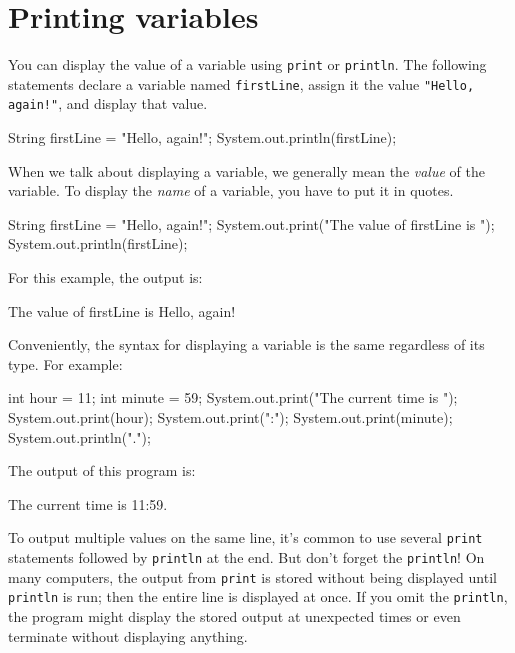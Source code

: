 \documentclass[12pt]{book}
\theoremstyle{exercise}
\newcommand{\java}[1]{\verb"#1"}
\begin{document}
\section{Printing variables}
\label{sec:printvar}

You can display the value of a variable using \java{print} or \java{println}.
The following statements declare a variable named \java{firstLine}, assign it the value \verb|"Hello, again!"|, and display that value.


\begin{code}
    String firstLine = "Hello, again!";
    System.out.println(firstLine);
\end{code}

%

When we talk about displaying a variable, we generally mean the {\em value} of the variable.
To display the {\em name} of a variable, you have to put it in quotes.

\begin{code}
    String firstLine = "Hello, again!";
    System.out.print("The value of firstLine is ");
    System.out.println(firstLine);
\end{code}

For this example, the output is:

\begin{stdout}
The value of firstLine is Hello, again!
\end{stdout}

Conveniently, the syntax for displaying a variable is the same regardless of its type.
For example:

\begin{code}
    int hour = 11;
    int minute = 59;
    System.out.print("The current time is ");
    System.out.print(hour);
    System.out.print(":");
    System.out.print(minute);
    System.out.println(".");
\end{code}

The output of this program is:

\begin{stdout}
The current time is 11:59.
\end{stdout}

To output multiple values on the same line, it's common to use several \java{print} statements followed by \java{println} at the end.
But don't forget the \java{println}!
On many computers, the output from \java{print} is stored without being displayed until \java{println} is run; then the entire line is displayed at once.
If you omit the \java{println}, the program might display the stored output at unexpected times or even terminate without displaying anything.
\end{document}
